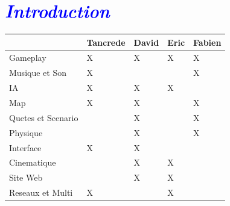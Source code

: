 \documentclass[12pt,a4paper]{report}
\begin{document}
\tableofcontents

\newpage

\chapter{\textcolor{blue}{\emph{Introduction}}}

\newpage
\begin{tabular}{|R{3.5cm}||C{1.5cm}|C{1.5cm}|C{1.5cm}|C{1.5cm}|}
\hline  & Tancrede & David & Eric & Fabien\\
\hline  Gameplay & X & X & X & X \\
\hline  Musique et Son & X &  &  & X\\
\hline  IA & X & X & X &   \\
\hline  Map & X & X &  & X  \\
\hline  Quetes et Scenario &  & X &  & X\\
\hline  Physique &  & X &  & X \\
\hline  Interface & X & X &  &  \\
\hline  Cinematique &  & X & X &  \\
\hline  Site Web &  & X & X &  \\
\hline  Reseaux et Multi & X &  & X &  \\
\hline  
\end{tabular}\\ 
\\\\\\\\\\
\end{document}
